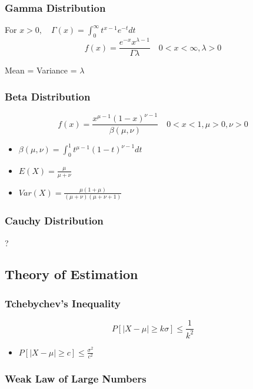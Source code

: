 \documentclass[12pt]{article}
\begin{document}
\subsubsection{Gamma Distribution}
For $x>0, \quad \Gamma (x) = \int_0^{\infty} t^{x-1}e^{-t} dt$ 
\newline
\[ f(x) = \frac{e^{-x}x^{\lambda-1}}{\Gamma \lambda} \quad 0<x<\infty , \lambda>0\]
\newline

Mean = Variance = $\lambda$

\subsubsection{Beta Distribution}
\[ f(x) = \frac{x^{\mu-1}(1-x)^{\nu-1}}{\beta(\mu, \nu)} \quad 0<x<1 , \mu>0, \nu>0\]
\newline
\begin{itemize}
    \item $\beta (\mu,\nu)=\int _{0}^{1}t^{\mu-1}(1-t)^{\nu-1} dt$
    \item $E(X) = \frac{\mu}{\mu+\nu}$
    \item $Var(X) = \frac{\mu(1+\mu)}{(\mu  +\nu)(\mu+\nu+1)}$
\end{itemize}

\subsubsection{Cauchy Distribution}
?


\subsection{Theory of Estimation}

\subsubsection{Tchebychev's Inequality}
\[ P[|X-\mu|\geq k\sigma] \leq \frac{1}{k^2}\]

\begin{itemize}
    \item $P[|X-\mu|\geq c] \leq \frac{\sigma^2}{c^2}$

\end{itemize}

\subsubsection{Weak Law of Large Numbers}
\end{document}
